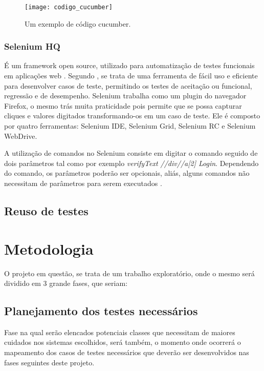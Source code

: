 \documentclass[12pt]{article}
\begin{document}
	\begin{figure}[!htb]
		\centering
		\texttt{[image: codigo\_cucumber]}
		\caption{Um exemplo de código cucumber.}
		\label{fig:codigo_cucumber}
	\end{figure}

	\subsubsection{Selenium HQ}
	É um framework open source, utilizado para automatização de testes funcionais em aplicações web \cite{chiavegatto1desenvolvimento}. Segundo \citeauthor{pereiraestudoselenium} \cite{pereiraestudoselenium}, se trata de uma ferramenta de fácil uso e eficiente para desenvolver casos de teste, permitindo os testes de aceitação ou funcional, regressão e de desempenho. 
	Selenium trabalha como um plugin do navegador Firefox, o mesmo trás muita praticidade pois permite que se possa capturar cliques e valores digitados transformando-os em um caso de teste. Ele é composto por quatro ferramentas: Selenium IDE, Selenium Grid, Selenium RC e Selenium WebDrive. 

	A  utilização  de  comandos  no  Selenium  consiste  em  digitar  o  comando  seguido  de  dois parâmetros  tal  como  por  exemplo \emph{verifyText //div//a[2] Login}. Dependendo  do  comando,  os parâmetros poderão ser opcionais, aliás, alguns comandos não necessitam de parâmetros para serem executados \cite{sixpenceautomatizaccao}.

	\subsection{Reuso de testes}

	\section{Metodologia}

	O projeto em questão, se trata de um trabalho exploratório, onde o mesmo será dividido em 3 grande fases, que seriam:

	\subsection{Planejamento dos testes necessários}
	Fase na qual serão elencados potenciais classes que necessitam de maiores cuidados nos sistemas escolhidos, será também, o momento onde ocorrerá o mapeamento dos casos de testes necessários que deverão ser
	desenvolvidos nas fases seguintes deste projeto.
\end{document}
